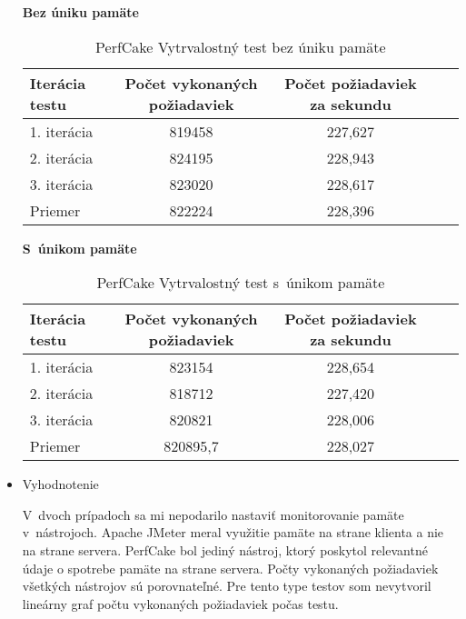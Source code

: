 \documentclass[12pt,oneside,final]{fithesis-utf8}
\begin{document}
\begin{itemize}
\textbf{Bez úniku pamäte}

\begin{table}[H]
\begin{center}
\begin{tabular}{ | l | c | c | c | c |}
		\hline
		 \textbf{Iterácia testu} & \textbf{Počet vykonaných požiadaviek} & \textbf{Počet požiadaviek za sekundu} \\ \hline
		 1. iterácia & 819458 & 227,627 \\ \hline
		 2. iterácia & 824195 & 228,943 \\ \hline
		 3. iterácia & 823020 & 228,617 \\ \hline
		 Priemer & 822224 & 228,396 \\ \hline
		 
\end{tabular}
\end{center}
\caption{PerfCake Vytrvalostný test bez úniku pamäte}
\end{table}
\newpage
\textbf{S~únikom pamäte}

\begin{table}[H]
\begin{center}
\begin{tabular}{ | l | c | c | c | c |}
		\hline
		 \textbf{Iterácia testu} & \textbf{Počet vykonaných požiadaviek} & \textbf{Počet požiadaviek za sekundu} \\ \hline
		 1. iterácia & 823154 & 228,654 \\ \hline
		 2. iterácia & 818712 & 227,420 \\ \hline
		 3. iterácia & 820821 & 228,006 \\ \hline
		 Priemer & 820895,7 & 228,027 \\ \hline
		 
\end{tabular}
\end{center}
\caption{PerfCake Vytrvalostný test s~únikom pamäte}
\end{table}

\item Vyhodnotenie

V~dvoch prípadoch sa mi nepodarilo nastaviť monitorovanie pamäte v~nástrojoch. Apache JMeter meral využitie pamäte na strane klienta a nie na strane servera. PerfCake bol jediný nástroj, ktorý poskytol relevantné údaje o spotrebe pamäte na strane servera. Počty vykonaných požiadaviek všetkých nástrojov sú porovnateľné. Pre tento type testov som nevytvoril lineárny graf počtu vykonaných požiadaviek počas testu.



\end{itemize}
\end{document}
